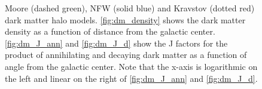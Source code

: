 \begin{figure}
	\centering
\caption{Moore (dashed green), NFW (solid blue) and Kravstov (dotted red) dark matter halo models.  \ref{fig:dm_density} shows the dark matter density as a function of distance from the galactic center.   \ref{fig:dm_J_ann} and \ref{fig:dm_J_d} show the J factors for the product of annihilating and decaying dark matter as a function of angle from the galactic center.  Note that the x-axis is logarithmic on the left and linear on the right of \ref{fig:dm_J_ann} and \ref{fig:dm_J_d}.}
\label{fig:dm_halos}
\end{figure} 
